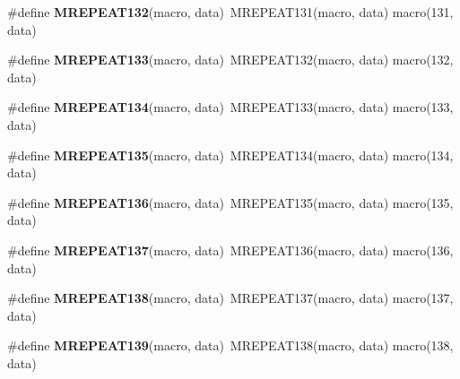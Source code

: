 \begin{DoxyCompactItemize}
\item 
\hypertarget{group__group__sam0__utils__mrepeat_ga70b3e029b2ca5370d287a710ba66cba3}{}\#define {\bfseries M\+R\+E\+P\+E\+A\+T132}(macro,  data)~M\+R\+E\+P\+E\+A\+T131(macro, data)   macro(131, data)\label{group__group__sam0__utils__mrepeat_ga70b3e029b2ca5370d287a710ba66cba3}

\item 
\hypertarget{group__group__sam0__utils__mrepeat_ga808576086998ab3ae33981a5b7a28c4c}{}\#define {\bfseries M\+R\+E\+P\+E\+A\+T133}(macro,  data)~M\+R\+E\+P\+E\+A\+T132(macro, data)   macro(132, data)\label{group__group__sam0__utils__mrepeat_ga808576086998ab3ae33981a5b7a28c4c}

\item 
\hypertarget{group__group__sam0__utils__mrepeat_gad697f86f8799147acde4ca488f87b446}{}\#define {\bfseries M\+R\+E\+P\+E\+A\+T134}(macro,  data)~M\+R\+E\+P\+E\+A\+T133(macro, data)   macro(133, data)\label{group__group__sam0__utils__mrepeat_gad697f86f8799147acde4ca488f87b446}

\item 
\hypertarget{group__group__sam0__utils__mrepeat_ga34c93ca93d79b5955fda5a08fd758e22}{}\#define {\bfseries M\+R\+E\+P\+E\+A\+T135}(macro,  data)~M\+R\+E\+P\+E\+A\+T134(macro, data)   macro(134, data)\label{group__group__sam0__utils__mrepeat_ga34c93ca93d79b5955fda5a08fd758e22}

\item 
\hypertarget{group__group__sam0__utils__mrepeat_ga57d2b47fe36fbbfeb3dc2d4d7aefaeb1}{}\#define {\bfseries M\+R\+E\+P\+E\+A\+T136}(macro,  data)~M\+R\+E\+P\+E\+A\+T135(macro, data)   macro(135, data)\label{group__group__sam0__utils__mrepeat_ga57d2b47fe36fbbfeb3dc2d4d7aefaeb1}

\item 
\hypertarget{group__group__sam0__utils__mrepeat_gaea5f05e5377ed7f7628b6b5bba397523}{}\#define {\bfseries M\+R\+E\+P\+E\+A\+T137}(macro,  data)~M\+R\+E\+P\+E\+A\+T136(macro, data)   macro(136, data)\label{group__group__sam0__utils__mrepeat_gaea5f05e5377ed7f7628b6b5bba397523}

\item 
\hypertarget{group__group__sam0__utils__mrepeat_ga26e5d13baa4707214f4782d3acc0f231}{}\#define {\bfseries M\+R\+E\+P\+E\+A\+T138}(macro,  data)~M\+R\+E\+P\+E\+A\+T137(macro, data)   macro(137, data)\label{group__group__sam0__utils__mrepeat_ga26e5d13baa4707214f4782d3acc0f231}

\item 
\hypertarget{group__group__sam0__utils__mrepeat_gaec99878cdc5458427287a040044924d3}{}\#define {\bfseries M\+R\+E\+P\+E\+A\+T139}(macro,  data)~M\+R\+E\+P\+E\+A\+T138(macro, data)   macro(138, data)\label{group__group__sam0__utils__mrepeat_gaec99878cdc5458427287a040044924d3}


\end{DoxyCompactItemize}
